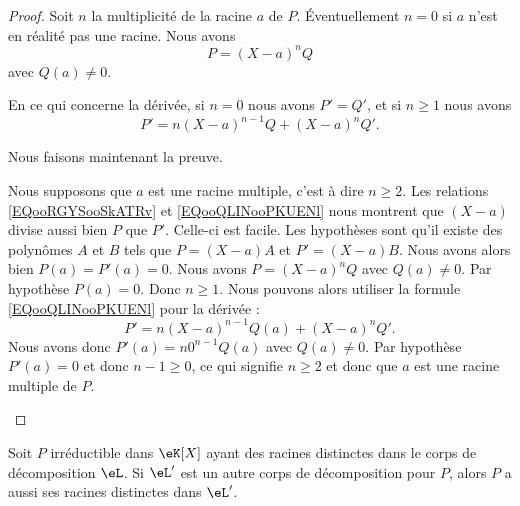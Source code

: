 \begin{proof}
    Soit \( n\) la multiplicité de la racine \( a\) de \( P\). Éventuellement \( n=0\) si \( a\) n'est en réalité pas une racine. Nous avons
    \begin{equation}        \label{EQooRGYSooSkATRv}
        P=(X-a)^nQ
    \end{equation}
    avec \( Q(a)\neq 0\).

    En ce qui concerne la dérivée, si \( n=0\) nous avons \( P'=Q'\), et si \( n\geq 1\) nous avons
    \begin{equation}        \label{EQooQLINooPKUENl}
        P'=n(X-a)^{n-1}Q+(X-a)^nQ'.
    \end{equation}

    Nous faisons maintenant la preuve.
    \begin{subproof}
        Nous supposons que \( a\) est une racine multiple, c'est à dire \( n\geq 2\). Les relations \eqref{EQooRGYSooSkATRv} et \eqref{EQooQLINooPKUENl} nous montrent que \( (X-a)\) divise aussi bien \( P\) que \( P'\).
        Celle-ci est facile. Les hypothèses sont qu'il existe des polynômes \( A\) et \( B\) tels que \( P=(X-a)A\) et \( P'=(X-a)B\). Nous avons alors bien \( P(a)=P'(a)=0\).
        Nous avons \( P=(X-a)^nQ\) avec \( Q(a)\neq 0\). Par hypothèse \( P(a)=0\). Donc \( n\geq 1\). Nous pouvons alors utiliser la formule \eqref{EQooQLINooPKUENl} pour la dérivée :
        \begin{equation}
            P'=n(X-a)^{n-1}Q(a)+(X-a)^nQ'.
        \end{equation}
        Nous avons donc \( P'(a)=n 0^{n-1}Q(a)\) avec \( Q(a)\neq 0\). Par hypothèse \( P'(a)=0\) et donc \( n-1\geq 0\), ce qui signifie \( n\geq 2\) et donc que \( a\) est une racine multiple de \( P\).
    \end{subproof}
\end{proof}


\begin{proposition}
	Soit \( P\) irréductible dans \( \eK[X]\) ayant des racines distinctes dans le corps de décomposition \( \eL\). Si \( \eL'\) est un autre corps de décomposition pour \( P\), alors \( P\) a aussi ses racines distinctes dans \( \eL'\).
\end{proposition}

